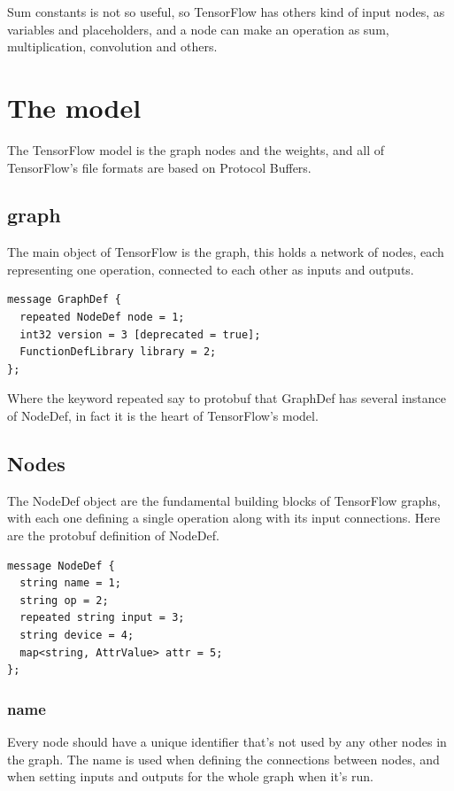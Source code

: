 \documentclass[11pt,openany]{book}
\begin{document}
Sum constants is not so useful, so TensorFlow has others kind of input nodes, as variables and placeholders, and a node can make an operation as sum, multiplication, convolution and others.

\section{The model}

The TensorFlow model is the graph nodes and the weights, and all of TensorFlow's file formats are based on Protocol Buffers.

\subsection{graph}
The main object of TensorFlow is the graph, this holds a network of nodes, each representing one operation, connected to each other as inputs and outputs.

\begin{verbatim}
message GraphDef {
  repeated NodeDef node = 1;
  int32 version = 3 [deprecated = true];
  FunctionDefLibrary library = 2;
};
\end{verbatim}

Where the keyword repeated say to protobuf that GraphDef has several instance of NodeDef, in fact it is the heart of TensorFlow's model.

\subsection{Nodes}

The NodeDef object  are the fundamental building blocks of TensorFlow graphs, with each one defining a single operation along with its input connections. Here are the protobuf definition of NodeDef.

\begin{verbatim}
message NodeDef {
  string name = 1;
  string op = 2;
  repeated string input = 3;
  string device = 4;
  map<string, AttrValue> attr = 5;
};
\end{verbatim}

\subsubsection{name}
Every node should have a unique identifier that's not used by any other nodes in the graph. The name is used when defining the connections between nodes, and when setting inputs and outputs for the whole graph when it's run.
\end{document}
